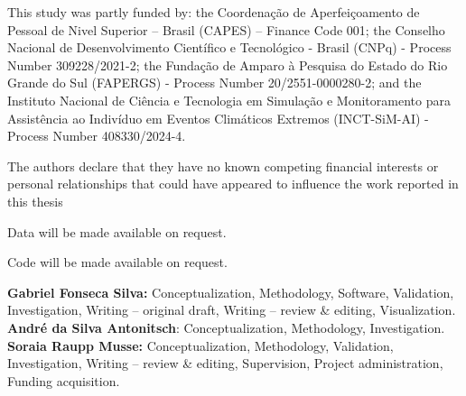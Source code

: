 \documentclass[pdflatex,sn-mathphys-num]{sn-jnl}%
\theoremstyle{thmstyleone}%
\theoremstyle{thmstyletwo}%
\theoremstyle{thmstylethree}%
\begin{document}
This study was partly funded by: the Coordenação de Aperfeiçoamento de Pessoal de Nivel Superior – Brasil (CAPES) – Finance Code 001; the Conselho Nacional de Desenvolvimento Científico e Tecnológico - Brasil (CNPq) - Process Number 309228/2021-2; the Fundação de Amparo à Pesquisa do Estado do Rio Grande do Sul (FAPERGS) - Process Number 20/2551-0000280-2; and the Instituto Nacional de Ciência e Tecnologia em
Simulação e Monitoramento para Assistência ao
Indivíduo em Eventos Climáticos Extremos (INCT-SiM-AI) - Process Number 408330/2024-4.

The authors declare that they have no known competing financial interests or personal relationships that could have appeared to
influence the work reported in this thesis

Data will be made available on request.

Code will be made available on request.

\textbf{Gabriel Fonseca Silva:} Conceptualization, Methodology, Software, Validation, Investigation, Writing – original draft, Writing – review \& editing, Visualization. \textbf{André da Silva Antonitsch}: Conceptualization, Methodology, Investigation. \textbf{Soraia Raupp Musse:} Conceptualization, Methodology, Validation, Investigation, Writing – review \& editing, Supervision, Project administration, Funding acquisition.
\end{document}

